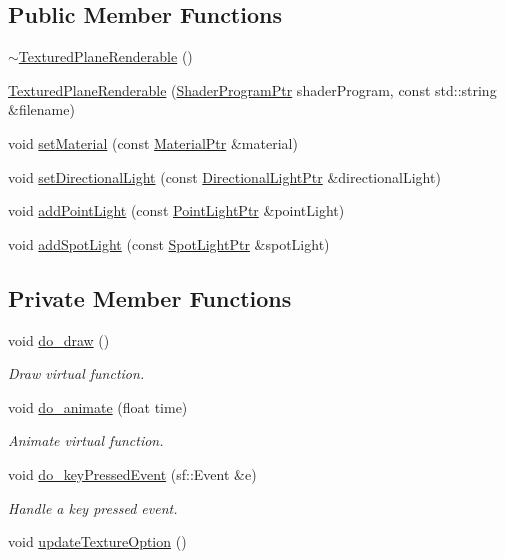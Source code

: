 \subsection*{Public Member Functions}
\begin{DoxyCompactItemize}
\item 
\hyperlink{classTexturedPlaneRenderable_a4d206c564a7671d03d1fc7bb9f59bc65}{$\sim$\+Textured\+Plane\+Renderable} ()
\item 
\hyperlink{classTexturedPlaneRenderable_aa93a87c5a8aef123b75d587b457e3d58}{Textured\+Plane\+Renderable} (\hyperlink{ShaderProgram_8hpp_af8e4af1ad4c53875ee5d32ab7e1f4966}{Shader\+Program\+Ptr} shader\+Program, const std\+::string \&filename)
\item 
void \hyperlink{classTexturedPlaneRenderable_af593daf438851f1de2cea6a4876b2b95}{set\+Material} (const \hyperlink{Material_8hpp_a1d47cd05ca683e287435cf0b363fbfe1}{Material\+Ptr} \&material)
\item 
void \hyperlink{classTexturedPlaneRenderable_ab1124a00c9b078a9c1baee89aded2dab}{set\+Directional\+Light} (const \hyperlink{Light_8hpp_ad8ef93288a101a8d8f185fb2a88f496d}{Directional\+Light\+Ptr} \&directional\+Light)
\item 
void \hyperlink{classTexturedPlaneRenderable_a8a9d2b91a18bbf73f3ebc50ddfe4a2cd}{add\+Point\+Light} (const \hyperlink{Light_8hpp_a28898b9799350669037caef13c5115d2}{Point\+Light\+Ptr} \&point\+Light)
\item 
void \hyperlink{classTexturedPlaneRenderable_ab5efc1a27904680b88ee3822946a3e52}{add\+Spot\+Light} (const \hyperlink{Light_8hpp_a1865f598c5eed6e6e1f79d7296852092}{Spot\+Light\+Ptr} \&spot\+Light)
\end{DoxyCompactItemize}
\subsection*{Private Member Functions}
\begin{DoxyCompactItemize}
\item 
void \hyperlink{classTexturedPlaneRenderable_ab81503b6d91dc3b3a16f774197a14438}{do\+\_\+draw} ()
\begin{DoxyCompactList}\small\item\em Draw virtual function. \end{DoxyCompactList}\item 
void \hyperlink{classTexturedPlaneRenderable_a945edb4f74583f73813821bfcecbda0f}{do\+\_\+animate} (float time)
\begin{DoxyCompactList}\small\item\em Animate virtual function. \end{DoxyCompactList}\item 
void \hyperlink{classTexturedPlaneRenderable_adc51b7b2ad32fb1ca8ccdbc59d9a9a4f}{do\+\_\+key\+Pressed\+Event} (sf\+::\+Event \&e)
\begin{DoxyCompactList}\small\item\em Handle a key pressed event. \end{DoxyCompactList}\item 
void \hyperlink{classTexturedPlaneRenderable_a8a48569cb0dcebe2b2840ff9807cdaad}{update\+Texture\+Option} ()
\end{DoxyCompactItemize}
